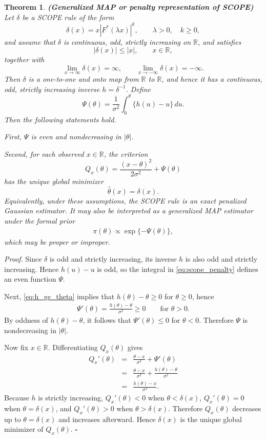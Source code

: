 \documentclass[11pt]{article}
\numberwithin{equation}{section}
\newtheorem{theorem}{Theorem}
\begin{document}
\medskip
\noindent
\begin{theorem}
\label{th:two}
{\bf (Generalized MAP or penalty representation of SCOPE)}
Let $\delta$ be a SCOPE rule of the form
$$
\delta(x)=x |F^*(\lambda x)|^k, \qquad \lambda>0,\quad k\geq 0,
$$
and assume that $\delta$ is continuous, odd, strictly increasing on ${\mathbb R}$, and satisfies
$$
|\delta(x)|\leq |x|,\qquad x\in{\mathbb R},
$$
together with
$$
\lim_{x\to\infty}\delta(x)=\infty,\qquad
\lim_{x\to-\infty}\delta(x)=-\infty.
$$
Then $\delta$ is a one-to-one and onto map from ${\mathbb R}$ to ${\mathbb R}$, and hence it has a continuous, odd, strictly increasing inverse $h=\delta^{-1}$.
Define
\begin{equation}
\label{eq:scope_penalty}
\Psi(\theta)
=
\frac{1}{\sigma^2}
\int_0^\theta \{h(u)-u\}\,du .
\end{equation}
Then the following statements hold.

First, $\Psi$ is even and nondecreasing in $|\theta|$.

Second, for each observed $x\in{\mathbb R}$, the criterion
$$
Q_x(\theta)=\frac{(x-\theta)^2}{2\sigma^2}+\Psi(\theta)
$$
has the unique global minimizer
$$
\widehat{\theta}(x)=\delta(x).
$$
Equivalently, under these assumptions, the SCOPE rule is an exact penalized Gaussian estimator. It may also be interpreted as a generalized MAP estimator under the formal prior
\begin{eqnarray}
\pi(\theta)\propto \exp\{-\Psi(\theta)\},
\label{eq:formal_prior_scope}
\end{eqnarray}
which may be proper or improper.
\end{theorem}

\medskip
\noindent
\emph{Proof.}
Since $\delta$ is odd and strictly increasing, its inverse $h$ is also odd and strictly increasing. Hence $h(u)-u$ is odd, so the integral in \eqref{eq:scope_penalty} defines an even function $\Psi$.

Next, \eqref{eq:h_ge_theta} implies that $h(\theta)-\theta \ge 0$ for $\theta \ge 0$, hence
\begin{eqnarray}
\Psi'(\theta) = \frac{h(\theta)-\theta}{\sigma^2} \ge 0
\qquad \mbox{for } \theta>0.
\end{eqnarray}
By oddness of $h(\theta)-\theta$, it follows that $\Psi'(\theta) \le 0$ for $\theta<0$. Therefore $\Psi$ is nondecreasing in $|\theta|$.

Now fix $x \in \mathbb{R}$. Differentiating $Q_x(\theta)$ gives
\begin{eqnarray}
Q_x'(\theta)
&=&
\frac{\theta-x}{\sigma^2} + \Psi'(\theta)
\nonumber \\
&=&
\frac{\theta-x}{\sigma^2} + \frac{h(\theta)-\theta}{\sigma^2}
\nonumber \\
&=&
\frac{h(\theta)-x}{\sigma^2}.
\label{eq:Qprime_scope}
\end{eqnarray}
Because $h$ is strictly increasing, $Q_x'(\theta)<0$ when $\theta<\delta(x)$, $Q_x'(\theta)=0$ when $\theta=\delta(x)$, and $Q_x'(\theta)>0$ when $\theta>\delta(x)$. Therefore $Q_x(\theta)$ decreases up to $\theta=\delta(x)$ and increases afterward. Hence $\delta(x)$ is the unique global minimizer of $Q_x(\theta)$.
\hfill $\square$
\end{document}
